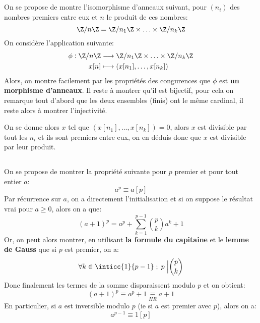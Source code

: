 \documentclass{report}
\begin{document}
   \subsection*{}
      On se propose de montre l'isomorphisme d'anneaux suivant, pour \((n_i)\) des nombres premiers entre eux et \(n\) le produit de ces nombres:
      \[
         \Z/{n\Z} = \Z/{n_1\Z} \times \ldots \times \Z/{n_k\Z}
      \]
      On considère l'application suivante:
      \[
         \begin{aligned}
            \phi : \Z/{n\Z} &\longrightarrow \Z/{n_1\Z} \times \ldots \times \Z/{n_k\Z}\\
            x[n] &\longmapsto (x[n_1], \ldots, x[n_k])
         \end{aligned}
      \]
      Alors, on montre facilement par les propriétés des congurences que \(\phi\) est \textbf{un morphisme d'anneaux}. Il reste à montrer qu'il est bijectif, pour cela on remarque tout d'abord que les deux ensembles (finis) ont le même cardinal, il reste alors à montrer l'injectivité.\<

      On se donne alors \(x\) tel que \((x[n_1], \ldots, x[n_k]) = 0\), alors \(x\) est divisible par tout les \(n_i\) et ils sont premiers entre eux, on en déduis donc que \(x\) est divisible par leur produit.

   \subsection*{}
   On se propose de montrer la propriété suivante pour \(p\) premier et pour tout entier \(a\):
   \[
      a^p \equiv a[p]
   \]
   Par récurrence sur \(a\), on a directement l'initialisation et si on suppose le résultat vrai pour \(a \geq 0\), alors on a que:
   \[
      (a + 1)^p = a^p + \sum_{k=1}^{p-1}\binom{p}{k}a^k + 1
   \]
   Or, on peut alors montrer, en utilisant \textbf{la formule du capitaine} et le \textbf{lemme de Gauss} que si \(p\) est premier, on a:
   \[
      \forall k \in \inticc{1}{p - 1}\; ; \; p \; \Big| \binom{p}{k}
   \]
   Donc finalement les termes de la somme disparaissent modulo \(p\) et on obtient:
   \[
      (a + 1)^p  \equiv a^p + 1 \underset{HR}{\equiv} a + 1
   \]
   En particulier, si \(a\) est inversible modulo \(p\) (ie si \(a\) est premier avec \(p\)), alors on a:
   \[
      a^{p-1} \equiv 1[p]
   \]
\end{document}

